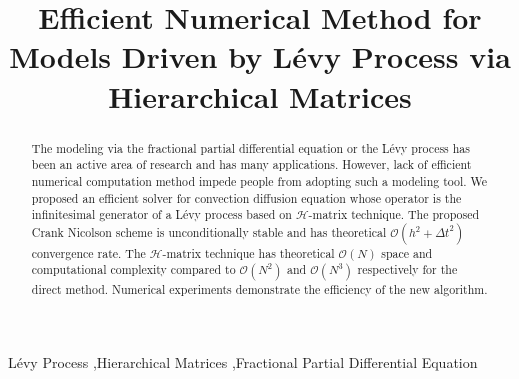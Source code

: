 \documentclass[3p,,preprint,12pt]{elsarticle}
\theoremstyle{definition}
\begin{document}
\begin{frontmatter}

\title{Efficient Numerical Method for Models Driven by L\'evy Process via Hierarchical Matrices}

\begin{abstract}
	The modeling via the fractional partial differential equation or the L\'evy process has been an active area of research and has many applications. However, lack of efficient numerical computation method impede people from adopting such a modeling tool. We proposed an efficient solver for convection diffusion equation whose operator is the infinitesimal generator of a L\'evy process based on $\mathcal{H}$-matrix technique. The proposed Crank Nicolson scheme is unconditionally stable and has theoretical $\mathcal{O}(h^2+\Delta t^2)$ convergence rate. The $\mathcal{H}$-matrix technique has theoretical $\mathcal{O}(N)$ space and computational complexity compared to $\mathcal{O}(N^2)$ and $\mathcal{O}(N^3)$ respectively for the direct method. Numerical experiments demonstrate the efficiency of the new algorithm. 
\end{abstract}


	\begin{keyword}
L\'evy Process \sep Hierarchical Matrices \sep Fractional Partial Differential Equation


\end{keyword}

\end{frontmatter}
\end{document}
